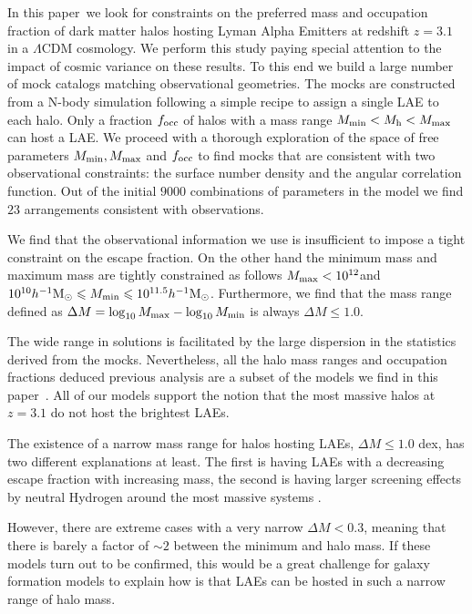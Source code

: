 \documentclass[usenatbib]{mn2e}
\newcommand{\documentname}{paper~}
\newcommand{\ly}{{\ifmmode{{\rm Ly}\alpha}\else{Ly$\alpha$~}\fi}}
\newcommand{\hMsun}{{\ifmmode{h^{-1}{\rm
        {M_{\odot}}}}\else{$h^{-1}{\rm{M_{\odot}}}$}\fi}}
\begin{document}
In this \documentname we look for constraints on the preferred mass
and occupation fraction of dark matter halos hosting Lyman Alpha Emitters at
redshift $z=3.1$ in a $\Lambda$CDM cosmology. We perform this study
paying special attention to the impact of cosmic variance on these
results. To this end we build a large number of mock catalogs matching
observational geometries. The mocks are constructed from a N-body simulation
following a simple recipe to assign a single LAE to each halo. Only
a fraction $f_{\rm occ}$ of halos with a mass range  $M_{\rm
  min}<M_{\rm h}<M_{\rm   max}$ can host a LAE. We proceed with a
thorough exploration of the space of free parameters $M_{\rm min},
M_{\rm max}$ and $f_{\rm occ}$ to find mocks that are consistent with
two observational constraints: the surface number density and the
angular correlation function. Out of the initial $9000$ 
combinations of parameters in the model we find $23$ arrangements
consistent with observations.

We find that the observational information we use is insufficient to
impose a tight constraint on the escape fraction. On the other hand
the minimum mass and maximum mass are tightly constrained as follows
$M_{\rm max}<10^{12}$\hMsun and $10^{10}\hMsun\leq M_{\rm min}\leq
10^{11.5}\hMsun$. Furthermore, we find that the mass range defined as
$\Delta M=\log_{10}M_{\rm max} - \log_{10}M_{\rm min}$ is always
$\Delta M\leq 1.0$.

The wide range in solutions is facilitated by the large dispersion in
the statistics derived from the mocks. Nevertheless, all the halo mass
ranges and occupation fractions deduced previous analysis
\citep[i.e.][]{Gawiser2007,Ouchi2010} are a subset of the models we
find in this \documentname. All of our models support the notion that
the most massive halos at $z=3.1$ do not host the brightest LAEs.

The existence of a narrow mass range for halos hosting LAEs, $\Delta
M\leq 1.0$ dex, has two different explanations at least. The
first is having LAEs with a decreasing \ly escape fraction with
increasing mass, the second is having larger screening effects by
neutral Hydrogen around the most massive systems
\citep{Laursen2009,ForeroRomero2011}.   

However, there are extreme cases with a very narrow $\Delta M<0.3$, meaning that
there is barely a factor of $\sim 2$ between the minimum and halo
mass. If these models turn out to be confirmed, this would be a great
challenge for galaxy formation models to explain how is that LAEs can
be hosted in such a narrow range of halo mass. 
\end{document}
